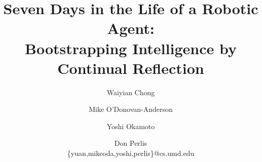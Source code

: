 \documentclass[]{llncs}
\begin{document}
\title{Seven Days in the Life of a Robotic Agent:\\
\small{Bootstrapping Intelligence by Continual Reflection}}


\author{Waiyian Chong \and Mike O'Donovan-Anderson \and
  Yoshi Okamoto \and Don Perlis\\
  \{yuan,mikeoda,yoshi,perlis\}@cs.umd.edu}


\maketitle


%
\end{document}
